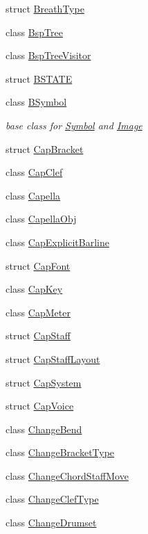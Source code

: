 \begin{DoxyCompactItemize}
struct \hyperlink{struct_ms_1_1_breath_type}{Breath\+Type}
\item 
class \hyperlink{class_ms_1_1_bsp_tree}{Bsp\+Tree}
\item 
class \hyperlink{class_ms_1_1_bsp_tree_visitor}{Bsp\+Tree\+Visitor}
\item 
struct \hyperlink{struct_ms_1_1_b_s_t_a_t_e}{B\+S\+T\+A\+TE}
\item 
class \hyperlink{class_ms_1_1_b_symbol}{B\+Symbol}
\begin{DoxyCompactList}\small\item\em base class for \hyperlink{class_ms_1_1_symbol}{Symbol} and \hyperlink{class_ms_1_1_image}{Image} \end{DoxyCompactList}\item 
struct \hyperlink{struct_ms_1_1_cap_bracket}{Cap\+Bracket}
\item 
class \hyperlink{class_ms_1_1_cap_clef}{Cap\+Clef}
\item 
class \hyperlink{class_ms_1_1_capella}{Capella}
\item 
class \hyperlink{class_ms_1_1_capella_obj}{Capella\+Obj}
\item 
class \hyperlink{class_ms_1_1_cap_explicit_barline}{Cap\+Explicit\+Barline}
\item 
struct \hyperlink{struct_ms_1_1_cap_font}{Cap\+Font}
\item 
class \hyperlink{class_ms_1_1_cap_key}{Cap\+Key}
\item 
class \hyperlink{class_ms_1_1_cap_meter}{Cap\+Meter}
\item 
struct \hyperlink{struct_ms_1_1_cap_staff}{Cap\+Staff}
\item 
struct \hyperlink{struct_ms_1_1_cap_staff_layout}{Cap\+Staff\+Layout}
\item 
struct \hyperlink{struct_ms_1_1_cap_system}{Cap\+System}
\item 
struct \hyperlink{struct_ms_1_1_cap_voice}{Cap\+Voice}
\item 
class \hyperlink{class_ms_1_1_change_bend}{Change\+Bend}
\item 
class \hyperlink{class_ms_1_1_change_bracket_type}{Change\+Bracket\+Type}
\item 
class \hyperlink{class_ms_1_1_change_chord_staff_move}{Change\+Chord\+Staff\+Move}
\item 
class \hyperlink{class_ms_1_1_change_clef_type}{Change\+Clef\+Type}
\item 
class \hyperlink{class_ms_1_1_change_drumset}{Change\+Drumset}
\item 

\end{DoxyCompactItemize}
